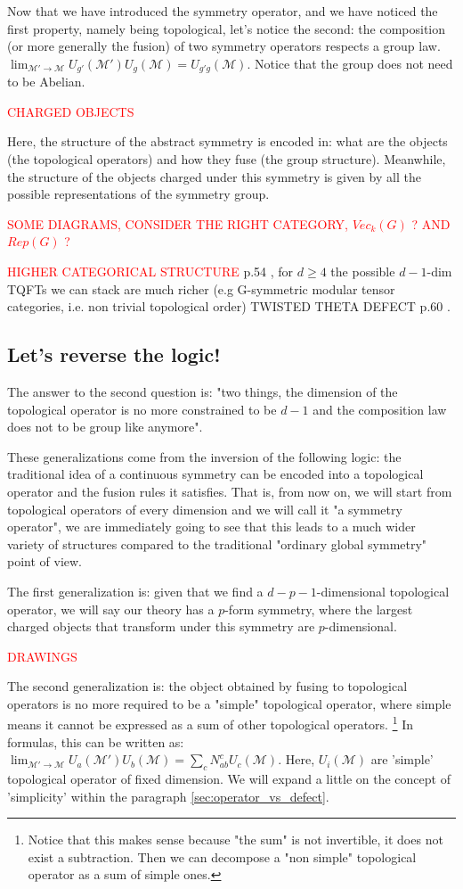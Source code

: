 \documentclass[aps,preprint,nofootinbib,preprintnumbers,eqsecnum,superscriptaddress]{revtex4}
\numberwithin{equation}{section}
\begin{document}
Now that we have introduced the symmetry operator, and we have noticed the first property, namely being topological, let's notice the second: the composition (or more generally the fusion) of two symmetry operators respects a group law. $\lim_{\mathcal{M'}\to\mathcal{M}}U_{g'}(\mathcal{M'})U_{g}(\mathcal{M}) = U_{g'g}(\mathcal{M})$. Notice that the group does not need to be Abelian.

\textcolor{red}{CHARGED OBJECTS}

Here, the structure of the abstract symmetry is encoded in: what are the objects (the topological operators) and how they fuse (the group structure). Meanwhile, the structure of the objects charged under this symmetry is given by all the possible representations of the symmetry group.

\textcolor{red}{SOME DIAGRAMS, CONSIDER THE RIGHT CATEGORY, $Vec_k (G)$ ? AND $Rep(G)$ ?}

\textcolor{red}{HIGHER CATEGORICAL STRUCTURE} p.54 \cite{schafernameki_2023}, for $d \geq 4$ the possible $d-1$-dim TQFTs we can stack are much richer (e.g G-symmetric modular tensor categories, i.e. non trivial topological order) TWISTED THETA DEFECT p.60 \cite{schafernameki_2023}.

\subsection{Let's reverse the logic!}
The answer to the second question is: "two things, the dimension of the topological operator is no more constrained to be $d-1$ and the composition law does not to be group like anymore".

These generalizations come from the inversion of the following logic: the traditional idea of a continuous symmetry can be encoded into a topological operator and the fusion rules it satisfies. That is, from now on, we will start from topological operators of every dimension and we will call it "a symmetry operator", we are immediately going to see that this leads to a much wider variety of structures compared to the traditional "ordinary global symmetry" point of view.

The first generalization is: given that we find a $d-p-1$-dimensional topological operator, we will say our theory has a $p$-form symmetry, where the largest charged objects that transform under this symmetry are $p$-dimensional.

\textcolor{red}{DRAWINGS}

The second generalization is: the object obtained by fusing to topological operators is no more required to be a "simple" topological operator, where simple means it cannot be expressed as a sum of other topological operators. \footnote{Notice that this makes sense because "the sum" is not invertible, it does not exist a subtraction. Then we can decompose a "non simple" topological operator as a sum of simple ones.} In formulas, this can be written as: $\lim_{\mathcal{M'}\to\mathcal{M}}U_{a}(\mathcal{M'})U_{b}(\mathcal{M}) = \sum_c N^c_{ab} U_{c}(\mathcal{M})$. Here, $U_{i}(\mathcal{M})$ are 'simple' topological operator of fixed dimension. We will expand a little on the concept of 'simplicity' within the paragraph \ref{sec:operator_vs_defect}.
\end{document}
